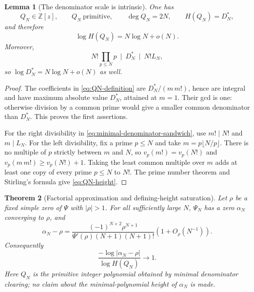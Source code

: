 \documentclass[11pt]{article}
\newtheorem{theorem}{Theorem}[section]
\newtheorem{lemma}[theorem]{Lemma}
\theoremstyle{definition}
\theoremstyle{remark}
\newcommand{\Z}{\mathbb Z}
\begin{document}
\begin{lemma}[The denominator scale is intrinsic]
\label{lem:truncation-denominator-scale}
One has
\[
 Q_N\in\Z[z],\qquad Q_N\ \text{primitive},\qquad \deg Q_N=2N,
 \qquad H(Q_N)=D_N^*,
\]
and therefore
\begin{equation}\label{eq:QN-height}
 \log H(Q_N)=N\log N+o(N).
\end{equation}
Moreover,
\begin{equation}\label{eq:minimal-denominator-sandwich}
 N!\prod_{p\le N}p\ \mid\ D_N^*\ \mid\ N!L_N,
\end{equation}
so $\log D_N^*=N\log N+o(N)$ as well.
\end{lemma}

\begin{proof}
The coefficients in \eqref{eq:QN-definition} are
$D_N^*/(m\,m!)$, hence are integral and have maximum absolute value
$D_N^*$, attained at $m=1$.  Their gcd is one: otherwise division by a
common prime would give a smaller common denominator than $D_N^*$.
This proves the first assertions.

For the right divisibility in \eqref{eq:minimal-denominator-sandwich}, use
$m!\mid N!$ and $m\mid L_N$.  For the left divisibility, fix a prime
$p\le N$ and take $m=p\lfloor N/p\rfloor$.  There is no multiple of $p$
strictly between $m$ and $N$, so
$v_p(m!)=v_p(N!)$ and
$v_p(m\,m!)\ge v_p(N!)+1$.  Taking the least common multiple over $m$
adds at least one copy of every prime $p\le N$ to $N!$.  The prime number
theorem and Stirling's formula give \eqref{eq:QN-height}.
\end{proof}

\begin{theorem}[Factorial approximation and defining-height saturation]
\label{thm:truncation-height-saturation}
Let $\rho$ be a fixed simple zero of $\Psi$ with $|\rho|>1$.  For all
sufficiently large $N$, $\Psi_N$ has a zero $\alpha_N$ converging to
$\rho$, and
\begin{equation}\label{eq:truncation-root-asymptotic}
 \boxed{
 \alpha_N-\rho=
 \frac{(-1)^{N+2}\rho^{N+1}}
 {\Psi'(\rho)(N+1)(N+1)!}
 \left(1+O_\rho(N^{-1})\right).}
\end{equation}
Consequently
\begin{equation}\label{eq:defining-height-ratio}
 \frac{-\log|\alpha_N-\rho|}{\log H(Q_N)}\longrightarrow1.
\end{equation}
Here $Q_N$ is the primitive integer polynomial obtained by minimal
denominator clearing; no claim about the minimal-polynomial height of
$\alpha_N$ is made.
\end{theorem}
\end{document}
